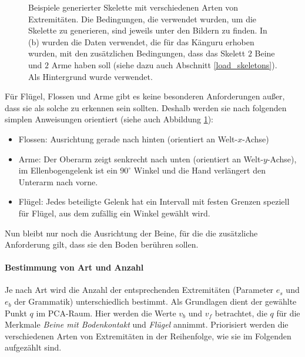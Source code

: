 \begin{figure}
 \caption{Beispiele generierter Skelette mit verschiedenen Arten von Extremitäten. Die Bedingungen, die verwendet wurden, um die Skelette zu generieren, sind jeweils unter den Bildern zu finden. In (b) wurden die Daten verwendet, die für das Känguru erhoben wurden, mit den zusätzlichen Bedingungen, dass das Skelett $2$ Beine und $2$ Arme haben soll (siehe dazu auch Abschnitt \ref{load_skeletons}). Als Hintergrund wurde \cite{background} verwendet.}
 \label{extremity_orientations}
\end{figure}

Für Flügel, Flossen und Arme gibt es keine besonderen Anforderungen außer, dass sie als solche zu erkennen sein sollten. Deshalb werden sie nach folgenden simplen Anweisungen orientiert (siehe auch Abbildung \ref{extremity_orientations}):
\begin{itemize}
 \item Flossen: Ausrichtung gerade nach hinten (orientiert an Welt-$x$-Achse)
 \item Arme: Der Oberarm zeigt senkrecht nach unten (orientiert an Welt-$y$-Achse), im Ellenbogengelenk ist ein $90^{\circ}$ Winkel und die Hand verlängert den Unterarm nach vorne.
 \item Flügel: Jedes beteiligte Gelenk hat ein Intervall mit festen Grenzen speziell für Flügel, aus dem zufällig ein Winkel gewählt wird.
\end{itemize}

Nun bleibt nur noch die Ausrichtung der Beine, für die die zusätzliche Anforderung gilt, dass sie den Boden berühren sollen.


\paragraph{Bestimmung von Art und Anzahl}

Je nach Art wird die Anzahl der entsprechenden Extremitäten (Parameter $e_s$ und $e_b$ der Grammatik) unterschiedlich bestimmt. Als Grundlagen dient der gewählte Punkt $q$ im PCA-Raum. Hier werden die Werte $v_b$ und $v_f$ betrachtet, die $q$ für die Merkmale \emph{Beine mit Bodenkontakt} und \emph{Flügel} annimmt. Priorisiert werden die verschiedenen Arten von Extremitäten in der Reihenfolge, wie sie im Folgenden aufgezählt sind.

